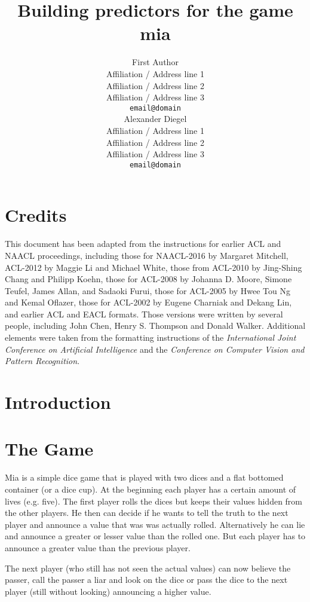 \documentclass[11pt]{article}
\title{Building predictors for the game mia}
\author{First Author \\
  Affiliation / Address line 1 \\
  Affiliation / Address line 2 \\
  Affiliation / Address line 3 \\
  {\tt email@domain} \\\And
  Alexander Diegel \\
  Affiliation / Address line 1 \\
  Affiliation / Address line 2 \\
  Affiliation / Address line 3 \\
  {\tt email@domain} \\}
\date{}
\begin{document}
\maketitle
\begin{abstract}
\end{abstract}

\section{Credits}

This document has been adapted from the instructions for earlier ACL
and NAACL proceedings, including those for NAACL-2016 by Margaret
Mitchell, ACL-2012 by Maggie Li and Michael
White, those from ACL-2010 by Jing-Shing Chang and Philipp Koehn,
those for ACL-2008 by Johanna D. Moore, Simone Teufel, James Allan,
and Sadaoki Furui, those for ACL-2005 by Hwee Tou Ng and Kemal
Oflazer, those for ACL-2002 by Eugene Charniak and Dekang Lin, and
earlier ACL and EACL formats. Those versions were written by several
people, including John Chen, Henry S. Thompson and Donald
Walker. Additional elements were taken from the formatting
instructions of the {\em International Joint Conference on Artificial
  Intelligence} and the \emph{Conference on Computer Vision and
Pattern Recognition}.

\section{Introduction}




\section{The Game}
Mia is a simple dice game that is played with two dices and a flat bottomed container (or a dice cup). At the beginning each player has a certain amount of lives (e.g. five).
The first player rolls the dices but keeps their values hidden from the other players. He then can decide if he wants to tell the truth to the next player and announce a value that was was actually rolled. Alternatively he can lie and announce a greater or lesser value than the rolled one.
But each player has to announce a greater value than the previous player.

The next player (who still has not seen the actual values) can now believe the passer, call the passer a liar and look on the dice or pass the dice to the next player (still without looking) announcing a higher value. 
\end{document}
